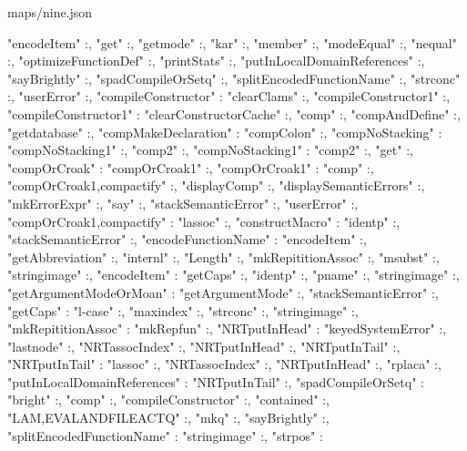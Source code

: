 \documentclass{article}
\begin{document}
\begin{chunk}{maps/nine.json}
{{{  "encodeItem"                 :{},
  "get"                        :{},
  "getmode"                    :{},
  "kar"                        :{},
  "member"                     :{},
  "modeEqual"                  :{},
  "nequal"                     :{},
  "optimizeFunctionDef"        :{},
  "printStats"                 :{},
  "putInLocalDomainReferences" :{},
  "sayBrightly"                :{},
  "spadCompileOrSetq"          :{},
  "splitEncodedFunctionName"   :{},
  "strconc"                    :{},
  "userError"                  :{}},
"compileConstructor" :{
  "clearClams"                 :{},
  "compileConstructor1"        :{}},
"compileConstructor1" :{
  "clearConstructorCache"      :{},
  "comp"                       :{},
  "compAndDefine"              :{},
  "getdatabase"                :{}},
"compMakeDeclaration" :{
  "compColon"                  :{}},
"compNoStacking" :{
  "compNoStacking1"            :{},
  "comp2"                      :{}},
"compNoStacking1" :{
  "comp2"                      :{},
  "get"                        :{}},
"compOrCroak" :{
  "compOrCroak1"               :{}},
"compOrCroak1" :{
  "comp"                       :{},
  "compOrCroak1,compactify"    :{},
  "displayComp"                :{},
  "displaySemanticErrors"      :{},
  "mkErrorExpr"                :{},
  "say"                        :{},
  "stackSemanticError"         :{},
  "userError"                  :{}},
"compOrCroak1,compactify" :{
  "lassoc"                     :{}},
"constructMacro" :{
  "identp"                     :{},
  "stackSemanticError"         :{}},
"encodeFunctionName" :{
  "encodeItem"                 :{},
  "getAbbreviation"            :{},
  "internl"                    :{},
  "Length"                     :{},
  "mkRepititionAssoc"          :{},
  "msubst"                     :{},
  "stringimage"                :{}},
"encodeItem" :{
  "getCaps"                    :{},
  "identp"                     :{},
  "pname"                      :{},
  "stringimage"                :{}},
"getArgumentModeOrMoan" :{
  "getArgumentMode"            :{},
  "stackSemanticError"         :{}},
"getCaps" :{
  "l-case"                     :{},
  "maxindex"                   :{},
  "strconc"                    :{},
  "stringimage"                :{}},
"mkRepititionAssoc" :{
  "mkRepfun"                   :{}},
"NRTputInHead" :{
  "keyedSystemError"           :{},
  "lastnode"                   :{},
  "NRTassocIndex"              :{},
  "NRTputInHead"               :{},
  "NRTputInTail"               :{}},
"NRTputInTail" :{
  "lassoc"                     :{},
  "NRTassocIndex"              :{},
  "NRTputInHead"               :{},
  "rplaca"                     :{}},
"putInLocalDomainReferences" :{
  "NRTputInTail"               :{}},
"spadCompileOrSetq" :{
  "bright"                     :{},
  "comp"                       :{},
  "compileConstructor"         :{},
  "contained"                  :{},
  "LAM,EVALANDFILEACTQ"        :{},
  "mkq"                        :{},
  "sayBrightly"                :{}},
"splitEncodedFunctionName" :{
  "stringimage"                :{},
  "strpos"                     :{}}

 }
}\end{chunk}
\end{document}

